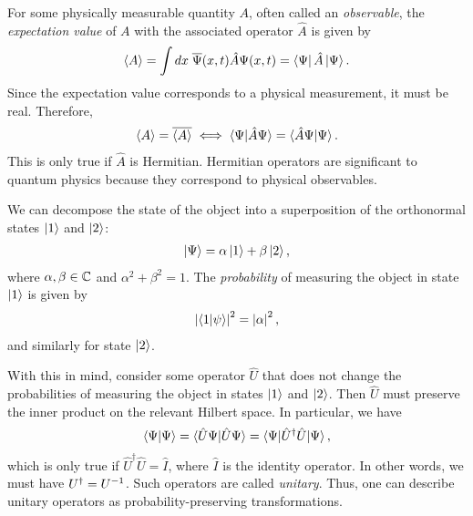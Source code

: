 For some physically measurable quantity $A$, often called an \textit{observable}, the \textit{expectation value} of $A$ with the associated operator $\hat{A}$ is given by
\begin{align*}
    \braket{A} = \int dx\; \overline{\Psi}(x,t)\hat{A}\Psi(x,t) = \bra{\Psi}\hat{A}\ket{\Psi}.
\end{align*}
Since the expectation value corresponds to a physical measurement, it must be real. Therefore,
\begin{align*}
    \braket{A} = \overline{\braket{A}} \iff \braket{\Psi|\hat{A}\Psi} = \braket{\hat{A}\Psi|\Psi}.
\end{align*}
This is only true if $\hat{A}$ is Hermitian. Hermitian operators are significant to quantum physics because they correspond to physical observables. 

We can decompose the state of the object into a superposition of the orthonormal states $\ket{1}$ and $\ket{2}$:
\begin{align*}
    \ket{\Psi} = \alpha\ket{1} + \beta\ket{2},
\end{align*}
where $\alpha,\beta\in\mathbb{C}$ and $\alpha^2+\beta^2=1$. The \textit{probability} of measuring the object in state $\ket{1}$ is given by
\begin{align*}
    \left|\braket{1|\psi}\right|^2 = \left|\alpha\right|^2,
\end{align*}
and similarly for state $\ket{2}$.

With this in mind, consider some operator $\hat{U}$ that does not change the probabilities of measuring the object in states $\ket{1}$ and $\ket{2}$. Then $\hat{U}$ must preserve the inner product on the relevant Hilbert space. In particular, we have
\begin{align*}
    \braket{\Psi|\Psi} = \braket{\hat{U}\Psi|\hat{U}\Psi} = \braket{\Psi|\hat{U}^\dagger\hat{U}|\Psi},
\end{align*}
which is only true if $\hat{U}^\dagger\hat{U}=\hat{I}$, where $\hat{I}$ is the identity operator. In other words, we must have $U^\dagger = { U }^{-1}$. Such operators are called \textit{unitary}. Thus, one can describe unitary operators as probability-preserving transformations.

